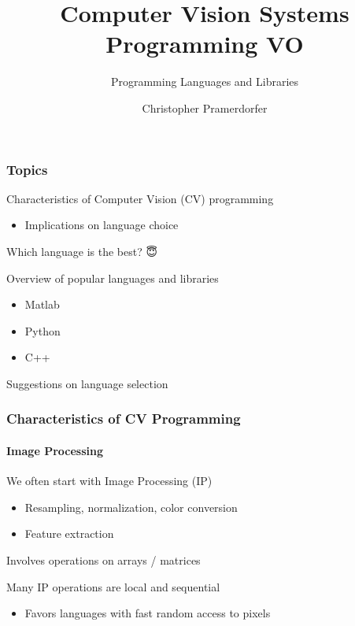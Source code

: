 \documentclass[xetex,professionalfont]{beamer}
\title{Computer Vision Systems Programming VO}
\subtitle{Programming Languages and Libraries}
\author{Christopher Pramerdorfer}
\institute{Computer Vision Lab, Vienna University of Technology}
\begin{document}

\begin{frame}
\maketitle
\end{frame}


\begin{frame}
\frametitle{Topics}

Characteristics of Computer Vision (CV) programming
\begin{itemize}
	\item Implications on language choice
\end{itemize}

\bigskip
Which language is the best? {\DejaSans 😇}

\bigskip
Overview of popular languages and libraries
\begin{itemize}
	\item Matlab
	\item Python
	\item C++
\end{itemize}

\bigskip
Suggestions on language selection

\end{frame}


\begin{frame}
\frametitle{Characteristics of CV Programming}
\framesubtitle{Image Processing}

We often start with Image Processing (IP)
\begin{itemize}
	\item Resampling, normalization, color conversion
	\item Feature extraction
\end{itemize}

\medskip
Involves operations on arrays / matrices

\bigskip
Many IP operations are local and sequential
\begin{itemize}
	\item Favors languages with fast random access to pixels %
\end{itemize}

\end{frame}
\end{document}
